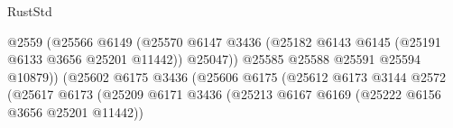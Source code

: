 \begin{lexlean}{RustStd}
\begin{coremodule}
                                                          @2559
                                                          (@25566
                                                            @6149
                                                            (@25570
                                                              @6147
                                                              @3436
                                                              (@25182
                                                                @6143
                                                                @6145
                                                                (@25191 @6133 @3656 @25201 @11442))
                                                              @25047))
                                                          @25585
                                                          @25588
                                                          @25591
                                                          @25594
                                                          @10879))
                                                      (@25602
                                                        @6175
                                                        @3436
                                                        (@25606
                                                          @6175
                                                          (@25612
                                                            @6173
                                                            @3144
                                                            @2572
                                                            (@25617
                                                              @6173
                                                              (@25209
                                                                @6171
                                                                @3436
                                                                (@25213
                                                                  @6167
                                                                  @6169
                                                                  (@25222
                                                                    @6156
                                                                    @3656
                                                                    @25201
                                                                    @11442))

\end{coremodule}
\end{lexlean}
